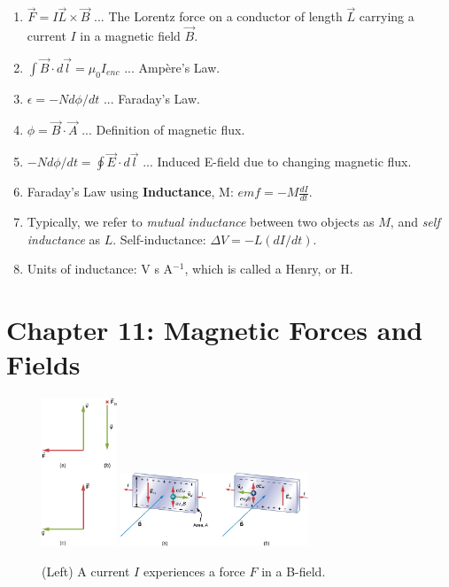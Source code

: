 \documentclass[10pt]{article}
\begin{document}
\begin{enumerate}
\item $\vec{F} = I\vec{L} \times \vec{B}$ ... The Lorentz force on a conductor of length $\vec{L}$ carrying a current $I$ in a magnetic field $\vec{B}$.
\item $\int \vec{B} \cdot d\vec{l} = \mu_0 I_{enc}$ ... Amp\`{e}re's Law.
\item $\epsilon = -N d\phi/dt$ ... Faraday's Law.
\item $\phi = \vec{B} \cdot \vec{A}$ ... Definition of magnetic flux.
\item $-N d\phi/dt = \oint \vec{E} \cdot d\vec{l}$ ... Induced E-field due to changing magnetic flux.
\item Faraday's Law using \textbf{Inductance}, M: $emf = -M \frac{dI}{dt}$.
\item Typically, we refer to \textit{mutual inductance} between two objects as $M$, and \textit{self inductance} as $L$.  Self-inductance: $\Delta V = -L (dI/dt)$.
\item Units of inductance: V s A$^{-1}$, which is called a Henry, or H.
\end{enumerate}

\clearpage

\section{Chapter 11: Magnetic Forces and Fields}

\begin{figure}
\centering
\includegraphics[width=0.2\textwidth]{bfield1.jpeg} \hspace{0.5cm}
\includegraphics[width=0.5\textwidth]{hallEffect1.jpeg}
\caption{\label{fig:chap11_1} (Left) A current $I$ experiences a force $F$ in a B-field.}
\end{figure}
\end{document}

